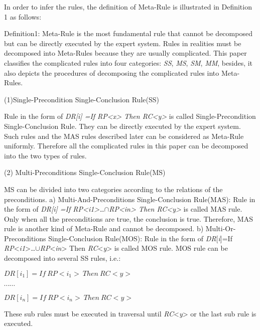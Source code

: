 \documentclass{elsarticle}
\begin{document}
\textrm{In order to infer the rules, the definition of Meta-Rule is
illustrated in Definition 1 as follows:}


\textrm{Definition1: Meta-Rule is the most fundamental rule that cannot
be decomposed but can be directly executed by the expert system. Rules
in realities must be decomposed into Meta-Rules because they are
usually complicated. This paper classifies the complicated rules into
four categories: }\textrm{\textit{SS}}\textrm{,
}\textrm{\textit{MS}}\textrm{, }\textrm{\textit{SM}}\textrm{,
}\textrm{\textit{MM}}\textrm{, besides, it also depicts the procedures
of decomposing the complicated rules into Meta-Rules.}

{
(1)Single-Precondition Single-Conclusion Rule(SS)}


\textrm{Rule in the form of }\textrm{\textit{DR[i] =If
RP{\textless}x{\textgreater} Then
RC{\textless}y{\textgreater}}}\textrm{ is called Single-Precondition
Single-Conclusion Rule. They can be directly executed by the expert
system. Such rules and the MAS rules described later can be considered
as Meta-Rule uniformly. Therefore all the complicated rules in this
paper can be decomposed into the two types of rules.}

{
(2) Multi-Preconditions Single-Conclusion Rule(MS)}


\textrm{MS can be divided into two categories according to the relations
of the preconditions.}
a) Multi-And-Preconditions Single-Conclusion Rule(MAS): Rule
in the form of \textrm{\textit{DR[i] =If
RP{\textless}i1{\textgreater}…${\cap}$RP{\textless}in{\textgreater}
Then RC{\textless}y{\textgreater}}}\textrm{ is called MAS rule. Only
when all the preconditions are true, the conclusion is true. Therefore,
MAS rule is another kind of Meta-Rule and cannot be decomposed.}
b) \textrm{Multi-Or-Preconditions Single-Conclusion Rule(MOS): Rule in the
form of }\textrm{\textit{DR}}\textrm{[}\textrm{\textit{i}}\textrm{]=If
}\textrm{\textit{RP}}\textrm{{\textless}}\textrm{\textit{i1}}\textrm{{\textgreater}…${\cup}$}\textrm{\textit{RP}}\textrm{{\textless}}\textrm{\textit{in}}\textrm{{\textgreater}
Then}\textrm{\textit{
RC}}\textrm{{\textless}}\textrm{\textit{y}}\textrm{{\textgreater} is
called MOS rule. MOS rule can be decomposed into several SS rules,
i.e.:}


$DR[i_1]=If \ RP<i_1> \ Then \  RC<y>$

$\cdots\cdots$

$DR[i_n]=If \ RP<i_n> \ Then \  RC<y>$

\textrm{These sub rules
must be executed in traversal until
}\textrm{\textit{RC}}\textrm{{\textless}}\textrm{\textit{y}}\textrm{{\textgreater}
or the last sub rule is executed.}
\end{document}
